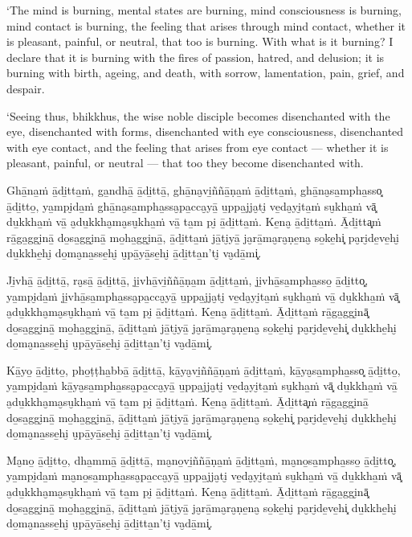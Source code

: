 ‘The mind is burning, mental states are burning, mind consciousness is
burning, mind contact is burning, the feeling that arises through mind
contact, whether it is pleasant, painful, or neutral, that too is
burning. With what is it burning? I declare that it is burning with the
fires of passion, hatred, and delusion; it is burning with birth,
ageing, and death, with sorrow, lamentation, pain, grief, and despair.

‘Seeing thus, bhikkhus, the wise noble disciple becomes disenchanted
with the eye, disenchanted with forms, disenchanted with eye
consciousness, disenchanted with eye contact, and the feeling that
arises from eye contact --- whether it is pleasant, painful, or
neutral --- that too they become disenchanted with.

\clearpage

\paliText
\markboth{\paliTitle}{\rightmark}

Ghā̱na̱ṁ ā̱di̱tta̱ṁ, ga̱ndhā̱ ā̱di̱ttā̱, ghā̱na̮vi̱ññā̱ṇa̱ṁ ā̱di̱tta̱ṁ, ghā̱na̮sa̱mpha̱sso͓
ā̱di̱tto̱, ya̱mpi̮da̱ṁ ghā̱na̮sa̱mpha̱ssa̮pa̱cca̮yā̱ u̱ppa̱jja̮ti̮ ve̱da̮yi̮ta̱ṁ su̮kha̱ṁ vā͓
du̱kkha̱ṁ vā̱ a̮du̱kkha̮ma̮su̮kha̱ṁ vā̱ ta̱m pi̮ ā̱di̱tta̱ṁ. Ke̱na̮ ā̱di̱tta̱ṁ. Ā̱di̱tta͓ṁ
rā̱ga̱ggi̮nā̱ do̱sa̱ggi̮nā̱ mo̱ha̱ggi̮nā̱, ā̱di̱tta̱ṁ jā̱ti̮yā̱ ja̮rā̱ma̮ra̮ṇe̱na̮ so̱ke̱hi͓
pa̮ri̮de̱ve̱hi̮ du̱kkhe̱hi̮ do̱ma̮na̱sse̱hi̮ u̮pā̱yā̱se̱hi̮ ā̱di̱tta̱n'ti̮ va̮dā̱mi͓.

Ji̱vhā̱ ā̱di̱ttā̱, ra̮sā̱ ā̱di̱ttā̱, ji̱vhā̱vi̱ññā̱ṇa̱m ā̱di̱tta̱ṁ, ji̱vhā̱sa̱mpha̱sso̱ ā̱di̱tto͓,
ya̱mpi̮da̱ṁ ji̱vhā̱sa̱mpha̱ssa̮pa̱cca̮yā̱ u̱ppa̱jja̮ti̮ ve̱da̮yi̮ta̱ṁ su̮kha̱ṁ vā̱ du̱kkha̱ṁ vā͓
a̮du̱kkha̮ma̮su̮kha̱ṁ vā̱ ta̱m pi̮ ā̱di̱tta̱ṁ. Ke̱na̮ ā̱di̱tta̱ṁ. Ā̱di̱tta̱ṁ rā̱ga̱ggi̮nā͓
do̱sa̱ggi̮nā̱ mo̱ha̱ggi̮nā̱, ā̱di̱tta̱ṁ jā̱ti̮yā̱ ja̮rā̱ma̮ra̮ṇe̱na̮ so̱ke̱hi̮ pa̮ri̮de̱ve̱hi͓
du̱kkhe̱hi̮ do̱ma̮na̱sse̱hi̮ u̮pā̱yā̱se̱hi̮ ā̱di̱tta̱n'ti̮ va̮dā̱mi͓.

Kā̱yo̱ ā̱di̱tto̱, pho̱ṭṭha̱bbā̱ ā̱di̱ttā̱, kā̱ya̮vi̱ññā̱ṇa̱ṁ ā̱di̱tta̱ṁ, kā̱ya̮sa̱mpha̱sso͓
ā̱di̱tto̱, ya̱mpi̮da̱ṁ kā̱ya̮sa̱mpha̱ssa̮pa̱cca̮yā̱ u̱ppa̱jja̮ti̮ ve̱da̮yi̮ta̱ṁ su̮kha̱ṁ vā͓
du̱kkha̱ṁ vā̱ a̮du̱kkha̮ma̮su̮kha̱ṁ vā̱ ta̱m pi̮ ā̱di̱tta̱ṁ. Ke̱na̮ ā̱di̱tta̱ṁ. Ā̱di̱tta͓ṁ
rā̱ga̱ggi̮nā̱ do̱sa̱ggi̮nā̱ mo̱ha̱ggi̮nā̱, ā̱di̱tta̱ṁ jā̱ti̮yā̱ ja̮rā̱ma̮ra̮ṇe̱na̮ so̱ke̱hi͓
pa̮ri̮de̱ve̱hi̮ du̱kkhe̱hi̮ do̱ma̮na̱sse̱hi̮ u̮pā̱yā̱se̱hi̮ ā̱di̱tta̱n'ti̮ va̮dā̱mi͓.

Ma̮no̱ ā̱di̱tto̱, dha̱mmā̱ ā̱di̱ttā̱, ma̮no̱vi̱ññā̱ṇa̱ṁ ā̱di̱tta̱ṁ, ma̮no̱sa̱mpha̱sso̱ ā̱di̱tto͓,
ya̱mpi̮da̱ṁ ma̮no̱sa̱mpha̱ssa̮pa̱cca̮yā̱ u̱ppa̱jja̮ti̮ ve̱da̮yi̮ta̱ṁ su̮kha̱ṁ vā̱ du̱kkha̱ṁ vā͓
a̮du̱kkha̮ma̮su̮kha̱ṁ vā̱ ta̱m pi̮ ā̱di̱tta̱ṁ. Ke̱na̮ ā̱di̱tta̱ṁ. Ā̱di̱tta̱ṁ rā̱ga̱ggi̮nā͓
do̱sa̱ggi̮nā̱ mo̱ha̱ggi̮nā̱, ā̱di̱tta̱ṁ jā̱ti̮yā̱ ja̮rā̱ma̮ra̮ṇe̱na̮ so̱ke̱hi̮ pa̮ri̮de̱ve̱hi͓
du̱kkhe̱hi̮ do̱ma̮na̱sse̱hi̮ u̮pā̱yā̱se̱hi̮ ā̱di̱tta̱n'ti̮ va̮dā̱mi͓.

